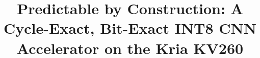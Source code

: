 \documentclass[conference,10pt]{IEEEtran}
\begin{document}
\title{Predictable by Construction: A Cycle-Exact, Bit-Exact INT8 CNN Accelerator on the Kria KV260}

\author{
}

\maketitle












\end{document}
